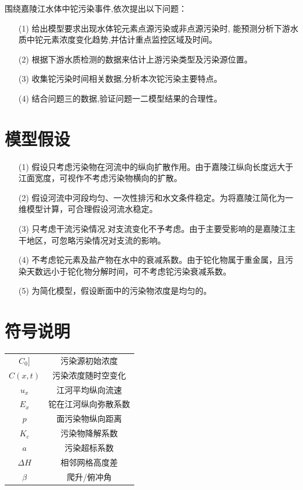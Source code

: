 \documentclass{whutmod}
\begin{document}
	围绕嘉陵江水体中铊污染事件,依次提出以下问题：
	
	\begin{itemize}
		\item [(1)]
		 给出模型要求出现水体铊元素点源污染或非点源污染时, 能预测分析下游水质中铊元素浓度变化趋势,并估计重点监控区域及时间。
		\item [(2)] 
		根据下游水质检测的数据来估计上游污染类型及污染源位置。
		\item [(3)] 收集铊污染时间相关数据,分析本次铊污染主要特点。
		\item [(4)] 结合问题三的数据,验证问题一二模型结果的合理性。
	\end{itemize}
	
	\section{模型假设}
	\begin{itemize}
		\item [(1)] 假设只考虑污染物在河流中的纵向扩散作用。由于嘉陵江纵向长度远大于江面宽度，可视作不考虑污染物横向的扩散。
		\item [(2)] 
		假设河流中河段均匀、一次性排污和水文条件稳定。为将嘉陵江简化为一维模型计算，可合理假设河流水稳定。
		\item [(3)]
		只考虑干流污染情况.对支流变化不予考虑。由于主要受影响的是嘉陵江主干地区，可忽略污染情况对支流的影响。
		\item [(4)]
		不考虑铊元素及盐产物在水中的衰减系数。由于铊化物属于重金属，且污染天数远小于铊化物分解时间，可不考虑铊污染衰减系数。
		\item [(5)] 为简化模型，假设断面中的污染物浓度是均匀的。
	\end{itemize}
	
	
	\section{符号说明}
	\begin{center}
		\begin{tabular}{cc}
			\hline
			\makebox[0.3\textwidth][c]{符号}	&  \makebox[0.4\textwidth][c]{意义} \\ \hline
			$C_{0}]$	    &  污染源初始浓度 \\ \hline
			$C(x,t)$	    &  污染浓度随时空变化 \\ \hline
			$u_{x}$	    &  江河平均纵向流速 \\ \hline
			$E_{x}$  &  铊在江河纵向弥散系数\\ \hline
		$p$   &  面污染物纵向距离\\ \hline
			$K_{c}$	    & 污染物降解系数  \\ \hline
		    $a$	& 污染超标系数 \\ \hline
		    $\Delta H$	& 相邻网格高度差 \\ \hline
		    $\beta $ & 爬升/俯冲角\\ \hline
		\end{tabular}
	\end{center}
\end{document}

